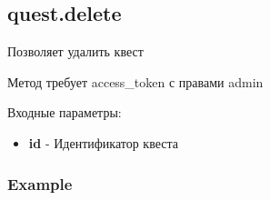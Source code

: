 \subsection{quest.delete}
Позволяет удалить квест

Метод требует access\_token с правами admin

Входные параметры:
\begin{itemize}
  \item \textbf{id} - Идентификатор квеста
\end{itemize}

\subsubsection{Example}
\begin{Verbatim}[frame=single]

\end{Verbatim}